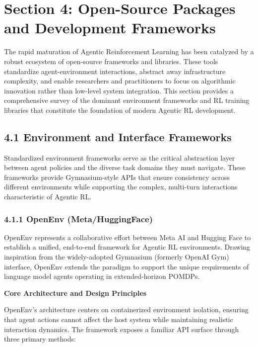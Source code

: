 \section{Section 4: Open-Source Packages and Development Frameworks}

The rapid maturation of Agentic Reinforcement Learning has been catalyzed by a robust ecosystem of open-source frameworks and libraries. These tools standardize agent-environment interactions, abstract away infrastructure complexity, and enable researchers and practitioners to focus on algorithmic innovation rather than low-level system integration. This section provides a comprehensive survey of the dominant environment frameworks and RL training libraries that constitute the foundation of modern Agentic RL development.

\subsection{4.1 Environment and Interface Frameworks}

Standardized environment frameworks serve as the critical abstraction layer between agent policies and the diverse task domains they must navigate. These frameworks provide Gymnasium-style APIs that ensure consistency across different environments while supporting the complex, multi-turn interactions characteristic of Agentic RL.

\subsubsection{4.1.1 OpenEnv (Meta/HuggingFace)}

OpenEnv represents a collaborative effort between Meta AI and Hugging Face to establish a unified, end-to-end framework for Agentic RL environments. Drawing inspiration from the widely-adopted Gymnasium (formerly OpenAI Gym) interface, OpenEnv extends the paradigm to support the unique requirements of language model agents operating in extended-horizon POMDPs.

\textbf{Core Architecture and Design Principles}

OpenEnv's architecture centers on containerized environment isolation, ensuring that agent actions cannot affect the host system while maintaining realistic interaction dynamics. The framework exposes a familiar API surface through three primary methods:

